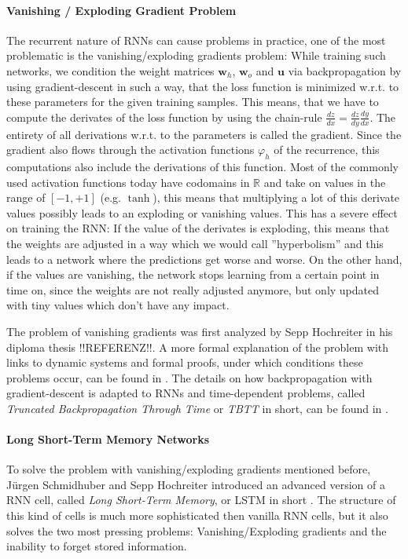 \paragraph{Vanishing / Exploding Gradient Problem} The recurrent nature of RNNs can cause problems in practice, one of the most problematic is the vanishing/exploding gradients problem: While training such networks, we condition the weight matrices $\mathbf{w}_h$, $\mathbf{w}_o$ and $\mathbf{u}$ via backpropagation by using gradient-descent in such a way, that the loss function is minimized w.r.t. to these parameters for the given training samples. This means, that we have to compute the derivates of the loss function by using the chain-rule $\frac{dz}{dx} = \frac{dz}{dy}\frac{dy}{dx}$. The entirety of all derivations w.r.t. to the parameters is called the gradient. Since the gradient also flows through the activation functions $\varphi_h$ of the recurrence, this computations also include the derivations of this function. Most of the commonly used activation functions today have codomains in $\mathbb{R}$ and take on values in the range of $[-1, +1]$ (e.g. $\operatorname{tanh}$), this means that multiplying a lot of this derivate values possibly leads to an exploding or vanishing values. This has a severe effect on training the RNN: If the value of the derivates is exploding, this means that the weights are adjusted in a way which we would call ''hyperbolism'' and this leads to a network where the predictions get worse and worse. On the other hand, if the values are vanishing, the network stops learning from a certain point in time on, since the weights are not really adjusted anymore, but only updated with tiny values which don't have any impact.

The problem of vanishing gradients was first analyzed by Sepp Hochreiter in his diploma thesis !!REFERENZ!!. A more formal explanation of the problem with links to dynamic systems and formal proofs, under which conditions these problems occur, can be found in \cite{Pascanu:2013}. The details on how backpropagation with gradient-descent is adapted to RNNs and time-dependent problems, called \emph{Truncated Backpropagation Through Time} or \emph{TBTT} in short, can be found in \cite{Werbos:1990}.

\paragraph{Long Short-Term Memory Networks} To solve the problem with vanishing/exploding gradients mentioned before, J\"urgen Schmidhuber and Sepp Hochreiter introduced an advanced version of a RNN cell, called \emph{Long Short-Term Memory}, or LSTM in short \cite{Hochreiter:1997}. The structure of this kind of cells is much more sophisticated then vanilla RNN cells, but it also solves the two most pressing problems: Vanishing/Exploding gradients and the inability to forget stored information.

